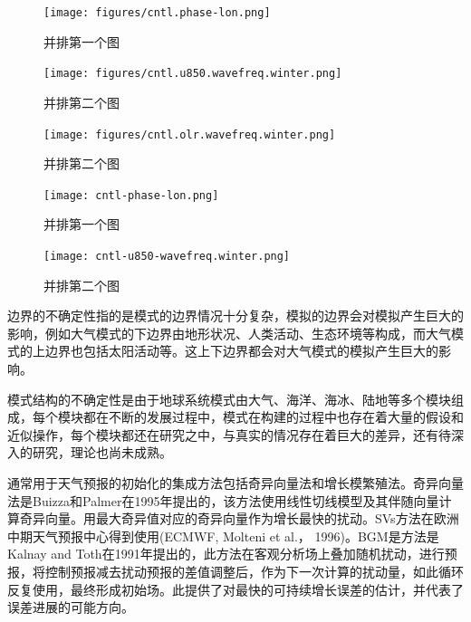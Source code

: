\begin{figure}
\begin{minipage}{0.48\textwidth}
  \centering
  \texttt{[image: figures/cntl.phase-lon.png]}
  \caption{并排第一个图}
  \label{fig:parallel1}
\end{minipage}\hfill
\begin{minipage}{0.48\textwidth}
  \centering
  \texttt{[image: figures/cntl.u850.wavefreq.winter.png]}
  \caption{并排第二个图}
  \label{fig:parallel2}
\end{minipage}
\begin{minipage}{0.48\textwidth}
  \centering
  \texttt{[image: figures/cntl.olr.wavefreq.winter.png]}
  \caption{并排第二个图}
  \label{fig:parallel2}
\end{minipage}
\end{figure}



\begin{figure}[H]
\begin{minipage}{0.28\textwidth}
  \centering
  \texttt{[image: cntl-phase-lon.png]}
  \caption{并排第一个图}
  \label{fig:parallel1}
\end{minipage}\hfill
\begin{minipage}{0.28\textwidth}
  \centering
  \texttt{[image: cntl-u850-wavefreq.winter.png]}
  \caption{并排第二个图}
  \label{fig:parallel2}
\end{minipage}
\end{figure}



边界的不确定性指的是模式的边界情况十分复杂，模拟的边界会对模拟产生巨大的影响，例如大气模式的下边界由地形状况、人类活动、生态环境等构成，而大气模式的上边界也包括太阳活动等。这上下边界都会对大气模式的模拟产生巨大的影响。

模式结构的不确定性是由于地球系统模式由大气、海洋、海冰、陆地等多个模块组成，每个模块都在不断的发展过程中，模式在构建的过程中也存在着大量的假设和近似操作，每个模块都还在研究之中，与真实的情况存在着巨大的差异，还有待深入的研究，理论也尚未成熟。

通常用于天气预报的初始化的集成方法包括奇异向量法和增长模繁殖法。奇异向量法是Buizza和Palmer在1995年提出的，该方法使用线性切线模型及其伴随向量计算奇异向量。用最大奇异值对应的奇异向量作为增长最快的扰动。SVs方法在欧洲中期天气预报中心得到使用(ECMWF, Molteni et al.， 1996)。BGM是方法是Kalnay and Toth在1991年提出的，此方法在客观分析场上叠加随机扰动，进行预报，将控制预报减去扰动预报的差值调整后，作为下一次计算的扰动量，如此循环反复使用，最终形成初始场。此提供了对最快的可持续增长误差的估计，并代表了误差进展的可能方向。

